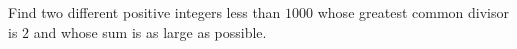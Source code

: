 Find two different positive integers less than $1000$ whose greatest common divisor is $2$ and whose sum is as large as possible.
